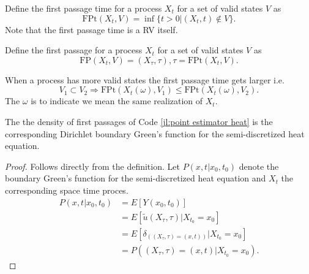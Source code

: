 \documentclass[a4paper,12pt]{article}
\begin{document}
\begin{definition} \label{def:first passage time}
    Define the first passage time for a process $X_{t}$ for a set of valid states
    $V$ as
    \begin{equation}
        \text{FPt}(X_{t},V)=\inf \{t>0| (X_{t},t) \notin V \}
        .
    \end{equation}
    Note that the first passage time is a RV itself.
\end{definition}

\begin{definition} \label{def:first passage}
    Define the first passage for a process $X_{t}$ for a set of valid states
    $V$ as
    \begin{equation}
        \text{FP}(X_{t},V)=(X_{\tau},\tau), \tau = \text{FPt}(X_{t},V)
        .
    \end{equation}
\end{definition}

\begin{lemma} \label{lem: FP order}
    When a process has more valid states the first passage time gets larger i.e.
    \begin{equation}
        V_{1} \subset V_{2} \Rightarrow
        \text{FPt}(X_{t}(\omega),V_{1}) \le  \text{FPt}(X_{t}(\omega),V_{2}) .
    \end{equation}
    The $\omega$ is to indicate we mean the same realization of $X_{t}$.
\end{lemma}

\begin{theorem}
    The the density of first passages of Code \ref{jl:point estimator heat} is  the
    corresponding Dirichlet boundary Green's function for the semi-discretized heat equation.
\end{theorem}

\begin{proof}
    Follows directly from the definition.
    Let $P(x,t|x_{0},t_{0})$ denote the boundary Green's
    function for the semi-discretized heat equation and $X_{t}$
    the corresponding space time proces.
    \begin{align}
        P(x,t|x_{0},t_{0}) & = E[Y(x_0,t_0)]                                         \\
                           & = E[\tilde{u}(X_{\tau},\tau) | X_{t_0} = x_0 ]          \\
                           & = E[\delta_{((X_{\tau},\tau) = (x,t))}| X_{t_0} = x_0 ] \\
                           & = P((X_{\tau},\tau) = (x,t)| X_{t_0} = x_0 )
        .
    \end{align}
\end{proof}
\end{document}
